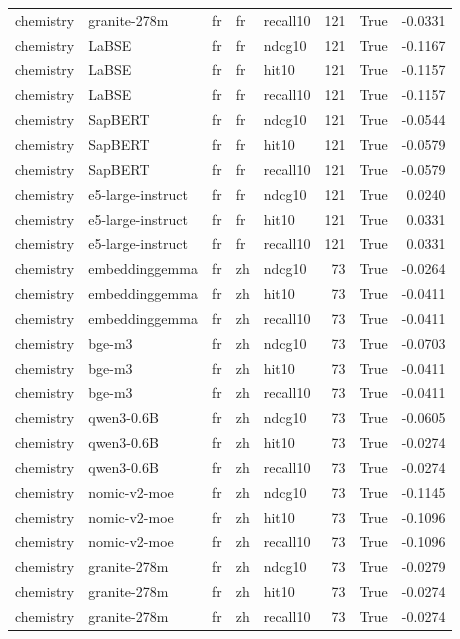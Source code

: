 \begin{tabular}{lllllrrr}
chemistry & granite-278m & fr & fr & recall10 & 121 & True & -0.0331 \\
chemistry & LaBSE & fr & fr & ndcg10 & 121 & True & -0.1167 \\
chemistry & LaBSE & fr & fr & hit10 & 121 & True & -0.1157 \\
chemistry & LaBSE & fr & fr & recall10 & 121 & True & -0.1157 \\
chemistry & SapBERT & fr & fr & ndcg10 & 121 & True & -0.0544 \\
chemistry & SapBERT & fr & fr & hit10 & 121 & True & -0.0579 \\
chemistry & SapBERT & fr & fr & recall10 & 121 & True & -0.0579 \\
chemistry & e5-large-instruct & fr & fr & ndcg10 & 121 & True & 0.0240 \\
chemistry & e5-large-instruct & fr & fr & hit10 & 121 & True & 0.0331 \\
chemistry & e5-large-instruct & fr & fr & recall10 & 121 & True & 0.0331 \\
chemistry & embeddinggemma & fr & zh & ndcg10 & 73 & True & -0.0264 \\
chemistry & embeddinggemma & fr & zh & hit10 & 73 & True & -0.0411 \\
chemistry & embeddinggemma & fr & zh & recall10 & 73 & True & -0.0411 \\
chemistry & bge-m3 & fr & zh & ndcg10 & 73 & True & -0.0703 \\
chemistry & bge-m3 & fr & zh & hit10 & 73 & True & -0.0411 \\
chemistry & bge-m3 & fr & zh & recall10 & 73 & True & -0.0411 \\
chemistry & qwen3-0.6B & fr & zh & ndcg10 & 73 & True & -0.0605 \\
chemistry & qwen3-0.6B & fr & zh & hit10 & 73 & True & -0.0274 \\
chemistry & qwen3-0.6B & fr & zh & recall10 & 73 & True & -0.0274 \\
chemistry & nomic-v2-moe & fr & zh & ndcg10 & 73 & True & -0.1145 \\
chemistry & nomic-v2-moe & fr & zh & hit10 & 73 & True & -0.1096 \\
chemistry & nomic-v2-moe & fr & zh & recall10 & 73 & True & -0.1096 \\
chemistry & granite-278m & fr & zh & ndcg10 & 73 & True & -0.0279 \\
chemistry & granite-278m & fr & zh & hit10 & 73 & True & -0.0274 \\
chemistry & granite-278m & fr & zh & recall10 & 73 & True & -0.0274 \\

\end{tabular}
